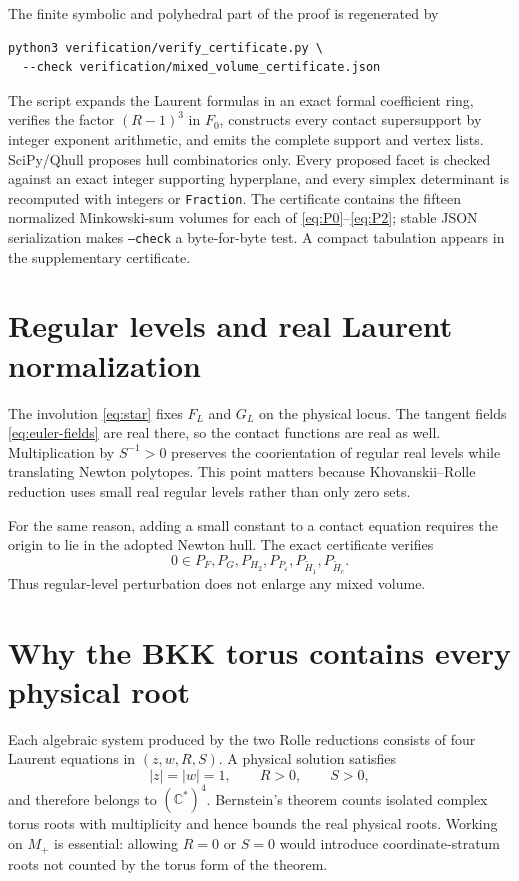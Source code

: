 \documentclass[11pt]{article}
\newcommand{\CC}{\mathbb C}
\begin{document}
The finite symbolic and polyhedral part of the proof is regenerated by
\begin{verbatim}
python3 verification/verify_certificate.py \
  --check verification/mixed_volume_certificate.json
\end{verbatim}
The script expands the Laurent formulas in an exact formal coefficient ring, verifies the factor $(R-1)^3$ in $F_0$, constructs every contact supersupport by integer exponent arithmetic, and emits the complete support and vertex lists.  SciPy/Qhull proposes hull combinatorics only.  Every proposed facet is checked against an exact integer supporting hyperplane, and every simplex determinant is recomputed with integers or \texttt{Fraction}.  The certificate contains the fifteen normalized Minkowski-sum volumes for each of \eqref{eq:P0}--\eqref{eq:P2}; stable JSON serialization makes \texttt{--check} a byte-for-byte test.  A compact tabulation appears in the supplementary certificate.

\appendix

\section{Regular levels and real Laurent normalization}\label{app:normalization}

The involution \eqref{eq:star} fixes $F_L$ and $G_L$ on the physical locus.  The tangent fields \eqref{eq:euler-fields} are real there, so the contact functions are real as well.  Multiplication by $S^{-1}>0$ preserves the coorientation of regular real levels while translating Newton polytopes.  This point matters because Khovanskii--Rolle reduction uses small real regular levels rather than only zero sets.

For the same reason, adding a small constant to a contact equation requires the origin to lie in the adopted Newton hull.  The exact certificate verifies
\[
 0\in P_F,P_G,P_{H_2},P_{P_\varepsilon},P_{\widetilde H_1},P_{\widetilde H_c}.
\]
Thus regular-level perturbation does not enlarge any mixed volume.

\section{Why the BKK torus contains every physical root}\label{app:torus}

Each algebraic system produced by the two Rolle reductions consists of four Laurent equations in $(z,w,R,S)$.  A physical solution satisfies
\[
 |z|=|w|=1,
 \qquad R>0,
 \qquad S>0,
\]
and therefore belongs to $(\CC^*)^4$.  Bernstein's theorem counts isolated complex torus roots with multiplicity and hence bounds the real physical roots.  Working on $M_+$ is essential: allowing $R=0$ or $S=0$ would introduce coordinate-stratum roots not counted by the torus form of the theorem.



\end{document}
